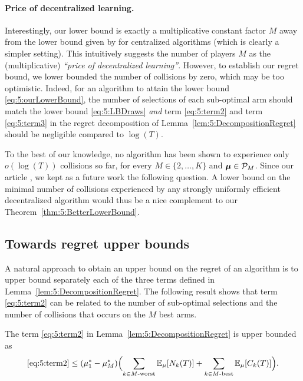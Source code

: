 \paragraph{Price of decentralized learning.}
%
Interestingly, our lower bound is exactly a multiplicative constant factor $M$ away from the lower bound given by \cite{Anantharam87a} for centralized algorithms (which is clearly a simpler setting). This intuitively suggests the number of players $M$ as the (multiplicative) \emph{``price of decentralized learning''}. However, to establish our regret bound, we lower bounded the number of collisions by zero, which may be too optimistic.
%
Indeed, for an algorithm to attain the lower bound \eqref{eq:5:ourLowerBound}, the number of selections of each sub-optimal arm should match the lower bound \eqref{eq:5:LBDraws} \emph{and} term \ref{eq:5:term2} and term \ref{eq:5:term3} in the regret decomposition of Lemma~\ref{lem:5:DecompositionRegret} should be negligible compared to  $\log(T)$.

To the best of our knowledge, no algorithm has been shown to experience only $o(\log(T))$ collisions so far,
for every $M \in \{2,\dots,K\}$ and $\boldsymbol{\mu} \in \mathcal{P}_M$.
%
Since our article \cite{Besson2018ALT}, we kept as a future work the following question.
A lower bound on the minimal number of collisions experienced by any strongly uniformly efficient decentralized algorithm would thus be a nice complement to our Theorem~\ref{thm:5:BetterLowerBound}.


\subsection{Towards regret upper bounds}
\label{sub:5:towardsRegretUpperBounds}

A natural approach to obtain an upper bound on the regret of an algorithm is to upper bound separately each of the three terms defined in Lemma~\ref{lem:5:DecompositionRegret}.
The following result shows that term \ref{eq:5:term2} can be related to the number of sub-optimal selections and the number of collisions that occurs on the $M$ best arms.

\begin{lemma}\label{lem:5:1stUpperBound}
\begin{leftbar}[lemmabar]  %
  The term \ref{eq:5:term2} in Lemma~\ref{lem:5:DecompositionRegret} is upper bounded as
  \begin{equation}\label{eq:5:1stUpperBound}
    \ref{eq:5:term2} \leq (\mu_1^* - \mu_M^*) \Bigl(    \sum_{k \in M\text{-}\mathrm{worst}} \mathbb{E}_{\mu}[N_k(T)]
    + \sum_{k \in M\text{-}\mathrm{best}} \mathbb{E}_{\mu}[C_{k}(T)]
    \Bigr).
  \end{equation}
\end{leftbar}  %
\end{lemma}

